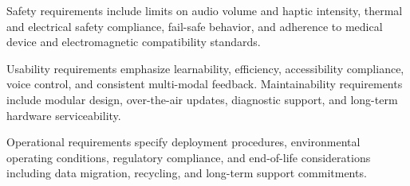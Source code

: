 Safety requirements include limits on audio volume and haptic intensity, thermal and electrical safety compliance, fail-safe behavior, and adherence to medical device and electromagnetic compatibility standards.

Usability requirements emphasize learnability, efficiency, accessibility compliance, voice control, and consistent multi-modal feedback. Maintainability requirements include modular design, over-the-air updates, diagnostic support, and long-term hardware serviceability.

Operational requirements specify deployment procedures, environmental operating conditions, regulatory compliance, and end-of-life considerations including data migration, recycling, and long-term support commitments.

